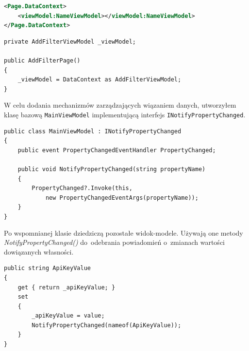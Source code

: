 \documentclass[a4paper,twoside,titlepage,openright]{book}
\begin{document}
\noindent
\begin{minipage}{\linewidth}
\begin{lstlisting}[caption=Podpięcie widok-modelu do~widoku w~pliku XAML, label=lst:test, language=xml]
<Page.DataContext>
	<viewModel:NameViewModel></viewModel:NameViewModel>
</Page.DataContext>
\end{lstlisting}
\end{minipage}


\noindent
\begin{minipage}{\linewidth}
\begin{lstlisting}[caption=Podpięcie widok-modelu w~pliku logiki strony, label=lst:test]
private AddFilterViewModel _viewModel;

public AddFilterPage() 
{
	_viewModel = DataContext as AddFilterViewModel;
}
\end{lstlisting}
\end{minipage}


\noindent
\begin{minipage}{\linewidth}

W celu dodania mechanizmów zarządzających wiązaniem danych, utworzyłem klasę bazową \texttt{MainViewModel} implementującą interfejs \texttt{INotifyPropertyChanged}. 

\begin{lstlisting}[caption=Implementacja interfejsu \texttt{INotifyPropertyChanged} w~klasie \texttt{MainViewModel}, label=lst:test]
public class MainViewModel : INotifyPropertyChanged
{
	public event PropertyChangedEventHandler PropertyChanged;
	
	public void NotifyPropertyChanged(string propertyName)
	{
		PropertyChanged?.Invoke(this,
			new PropertyChangedEventArgs(propertyName));
	}
}
\end{lstlisting}
\end{minipage}

Po wspomnianej klasie dziedziczą pozostałe widok-modele. Używają one metody \textit{NotifyPropertyChanged()} do~odebrania powiadomień o~zmianach wartości dowiązanych własności.

\noindent
\begin{minipage}{\linewidth}
\begin{lstlisting}[caption=Przykładowa właściwość wykorzystująca mechanizm NotifyPropertyChanged, label=lst:test]
public string ApiKeyValue
{
	get { return _apiKeyValue; }
	set
	{
		_apiKeyValue = value;
		NotifyPropertyChanged(nameof(ApiKeyValue));
	}
}
\end{lstlisting}
\end{minipage}
\end{document}
